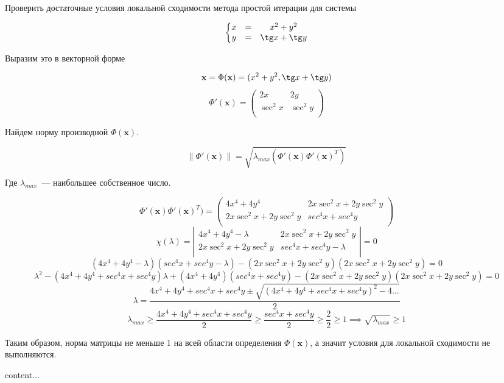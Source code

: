 \documentclass[11pt,a4paper,oneside]{article}
\newcommand{\norm}[1]{\left\lVert#1\right\rVert}
\begin{document}
\begin{problem}
Проверить достаточные условия локальной сходимости метода простой итерации для системы
	
$$
\left\{\begin{matrix}
	x & = & x^2 + y^2 \\
	y & = & \tg x + \tg y \\
\end{matrix} \right.
$$
\end{problem}

Выразим это в векторной форме

$$ \mathbf{x} = \Phi(\mathbf{x}) = (x^2 + y^2, \tg x + \tg y) $$
$$ \Phi'(\mathbf{x}) = \left(\begin{matrix}
	2x & 2y \\
	\sec^2 x & \sec^2 y \\
\end{matrix}\right) $$

Найдем норму производной $\Phi(\mathbf{x})$.

$$ \norm{\Phi'(\mathbf{x})} = \sqrt{\lambda_{max}(\Phi'(\mathbf{x}) \Phi'(\mathbf{x})^T)} $$

Где $\lambda_{max}$~--- наибольшее собственное число.

$$ \Phi'(\mathbf{x}) \Phi'(\mathbf{x})^T) = \left( \begin{matrix}
	4 x^4 + 4 y^4 & 2x \sec^2 x + 2y \sec^2 y \\
	2x \sec^2 x + 2y \sec^2 y & sec^4 x + sec^4 y \\
\end{matrix} \right) $$
$$ \chi(\lambda) = \left| \begin{matrix}
	4 x^4 + 4 y^4 - \lambda & 2x \sec^2 x + 2y \sec^2 y \\
	2x \sec^2 x + 2y \sec^2 y & sec^4 x + sec^4 y - \lambda \\
\end{matrix} \right| = 0 $$
$$ (4 x^4 + 4 y^4 - \lambda) (sec^4 x + sec^4 y - \lambda) - (2x \sec^2 x + 2y \sec^2 y) (2x \sec^2 x + 2y \sec^2 y) = 0 $$
$$ \lambda^2 - (4 x^4 + 4 y^4 + sec^4 x + sec^4 y) \lambda + (4 x^4 + 4 y^4) (sec^4 x + sec^4 y) - (2x \sec^2 x + 2y \sec^2 y) (2x \sec^2 x + 2y \sec^2 y) = 0 $$
$$ \lambda = \frac{4 x^4 + 4 y^4 + sec^4 x + sec^4 y \pm \sqrt{(4 x^4 + 4 y^4 + sec^4 x + sec^4 y)^2 - 4 \dots}}{2} $$
$$ \lambda_{max} \ge \frac{4 x^4 + 4 y^4 + sec^4 x + sec^4 y}{2}
	\ge \frac{sec^4 x + sec^4 y}{2} \ge \frac{2}{2} \ge 1 \implies \sqrt{\lambda_{max}} \ge 1 $$
	
Таким образом, норма матрицы не меньше 1 на всей области определения $\Phi(\mathbf{x})$, а значит условия для локальной сходимости не выполняются.

\begin{problem}
	content...
\end{problem}
\end{document}
